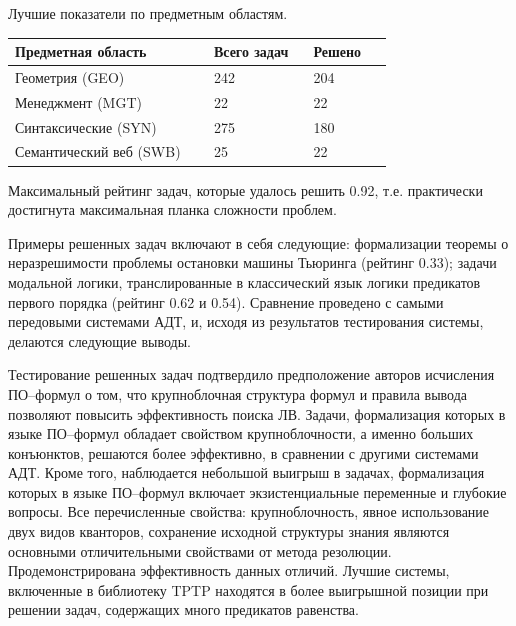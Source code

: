 \documentclass[a4paper]{report}
\begin{document}
Лучшие показатели по предметным областям.

{\small{}
\begin{longtable}[H]{|p{0.4\linewidth}|p{0.2\linewidth}|p{0.15\linewidth}|}
\hline
\textbf{Предметная область} & \textbf{Всего задач} & \textbf{Решено} \\
\hline
Геометрия (GEO) & 242 & 204 \\
\hline
Менеджмент (MGT) & 22 & 22 \\
\hline
Синтаксические (SYN) & 275 & 180 \\
\hline
Семантический веб (SWB) & 25 & 22 \\
\hline
\end{longtable}
}



Максимальный рейтинг задач, которые удалось решить 0.92, т.е. практически достигнута максимальная планка сложности проблем.

Примеры решенных задач включают в себя следующие: формализации теоремы о неразрешимости проблемы остановки машины Тьюринга (рейтинг 0.33); задачи модальной логики, транслированные в классический язык логики предикатов первого порядка (рейтинг 0.62 и 0.54). Сравнение проведено с самыми передовыми системами АДТ, и, исходя из результатов тестирования системы, делаются следующие выводы.

Тестирование решенных задач подтвердило предположение авторов исчисления ПО--формул о том, что крупноблочная структура формул и правила вывода позволяют повысить эффективность поиска ЛВ. Задачи, формализация которых в языке ПО--формул обладает свойством крупноблочности, а именно больших конъюнктов, решаются более эффективно, в сравнении с другими системами АДТ. Кроме того, наблюдается небольшой выигрыш в задачах, формализация которых в языке ПО--формул включает экзистенциальные переменные и глубокие вопросы. Все перечисленные свойства: крупноблочность, явное использование двух видов кванторов, сохранение исходной структуры знания являются основными отличительными свойствами от метода резолюции. Продемонстрирована эффективность данных отличий. Лучшие системы, включенные в библиотеку TPTP находятся в более выигрышной позиции при решении задач, содержащих много предикатов равенства.
\end{document}
